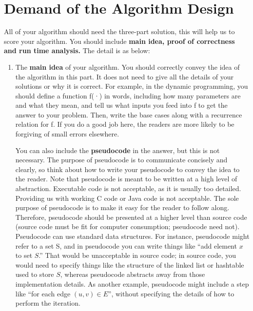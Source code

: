 \documentclass{article}
\begin{document}
\section*{Demand of the Algorithm Design}
All of your algorithm should need the three-part solution, this will help us to score your algorithm. You should include {\large\textbf{main idea,  proof of correctness and run time analysis.}} The detail is as below:
\begin{enumerate}

	\item The {\textbf{main idea}} of your algorithm. You should correctly convey the idea of the algorithm in this part. It does not need to give all the details of your solutions or why it is correct. For example, in the dynamic programming, you should define a function f(·) in words, including how many parameters are and what they mean, and tell us what inputs you feed into f to get the answer to your problem. Then, write the base cases along with a recurrence relation for f. If you do a good job here, the readers are more likely to be forgiving of small errors elsewhere.

	      You can also include the {\textbf{pseudocode}} in the answer, but this is not necessary. The purpose of pseudocode is to communicate concisely and clearly, so think about how to write your pseudocode to convey the idea to the
	      reader.
	      Note that pseudocode is meant to be written at a high level of abstraction. Executable code is
	      not acceptable, as it is usually too detailed. Providing us with working C code or Java code
	      is not acceptable. The sole purpose of pseudocode is to make it easy for the reader to follow
	      along. Therefore, pseudocode should be presented at a higher level than source code (source
	      code must be fit for computer consumption; pseudocode need not). Pseudocode can use
	      standard data structures. For instance, pseudocode might refer to a set S, and in pseudocode
	      you can write things like “add element $x$ to set $S$.” That would be unacceptable in source
	      code; in source code, you would need to specify things like the structure of the linked list
	      or hashtable used to store $S$, whereas pseudocode abstracts away from those implementation
	      details. As another example, pseudocode might include a step like “for each edge $(u, v) \in E$”,
	      without specifying the details of how to perform the iteration.


\end{enumerate}
\end{document}
